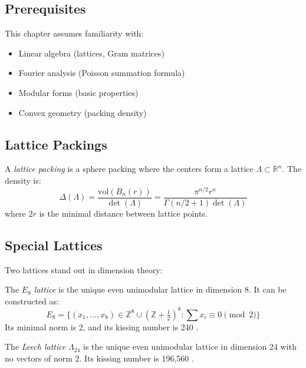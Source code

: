 \subsection{Prerequisites}
This chapter assumes familiarity with:
\begin{itemize}
\item Linear algebra (lattices, Gram matrices)
\item Fourier analysis (Poisson summation formula)
\item Modular forms (basic properties)
\item Convex geometry (packing density)
\end{itemize}

\subsection{Lattice Packings}

\begin{definition}
A \emph{lattice packing} is a sphere packing where the centers form a lattice $\Lambda \subset \mathbb{R}^n$. The density is:
\begin{equation}
\Delta(\Lambda) = \frac{\text{vol}(B_n(r))}{\det(\Lambda)} = \frac{\pi^{n/2} r^n}{\Gamma(n/2 + 1) \det(\Lambda)}
\end{equation}
where $2r$ is the minimal distance between lattice points.
\end{definition}

\subsection{Special Lattices}

Two lattices stand out in dimension theory:

\begin{definition}[$E_8$ Lattice]
The \emph{$E_8$ lattice} is the unique even unimodular lattice in dimension 8. It can be constructed as:
\begin{equation}
E_8 = \{(x_1, \ldots, x_8) \in \mathbb{Z}^8 \cup (\mathbb{Z} + \tfrac{1}{2})^8 : \sum x_i \equiv 0 \pmod{2}\}
\end{equation}
Its minimal norm is 2, and its kissing number is 240 \cite{conway1999}.
\end{definition}

\begin{definition}
The \emph{Leech lattice} $\Lambda_{24}$ is the unique even unimodular lattice in dimension 24 with no vectors of norm 2. Its kissing number is 196,560 \cite{conway1999}.
\end{definition}

